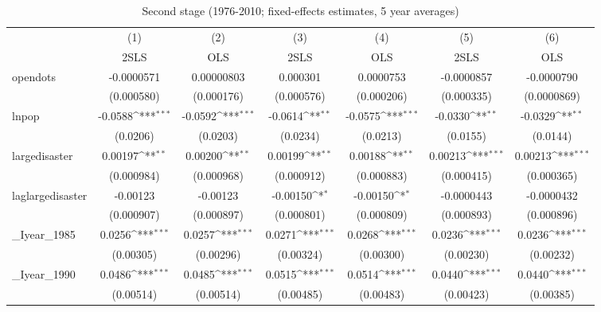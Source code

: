 \begin{table}[htbp]\centering
\def\sym#1{\ifmmode^{#1}\else\(^{#1}\)\fi}
\caption{Second stage (1976-2010; fixed-effects estimates, 5 year averages)}
\begin{tabular}{l*{6}{c}}
\hline\hline
          &\multicolumn{1}{c}{(1)}&\multicolumn{1}{c}{(2)}&\multicolumn{1}{c}{(3)}&\multicolumn{1}{c}{(4)}&\multicolumn{1}{c}{(5)}&\multicolumn{1}{c}{(6)}\\
          &\multicolumn{1}{c}{2SLS}&\multicolumn{1}{c}{OLS}&\multicolumn{1}{c}{2SLS}&\multicolumn{1}{c}{OLS}&\multicolumn{1}{c}{2SLS}&\multicolumn{1}{c}{OLS}\\
\hline
opendots  &-0.0000571         &0.00000803         & 0.000301         &0.0000753         &-0.0000857         &-0.0000790         \\
          &(0.000580)         &(0.000176)         &(0.000576)         &(0.000206)         &(0.000335)         &(0.0000869)         \\
[1em]
lnpop     &  -0.0588\sym{***}&  -0.0592\sym{***}&  -0.0614\sym{**} &  -0.0575\sym{***}&  -0.0330\sym{**} &  -0.0329\sym{**} \\
          & (0.0206)         & (0.0203)         & (0.0234)         & (0.0213)         & (0.0155)         & (0.0144)         \\
[1em]
largedisaster&  0.00197\sym{**} &  0.00200\sym{**} &  0.00199\sym{**} &  0.00188\sym{**} &  0.00213\sym{***}&  0.00213\sym{***}\\
          &(0.000984)         &(0.000968)         &(0.000912)         &(0.000883)         &(0.000415)         &(0.000365)         \\
[1em]
laglargedisaster& -0.00123         & -0.00123         & -0.00150\sym{*}  & -0.00150\sym{*}  &-0.0000443         &-0.0000432         \\
          &(0.000907)         &(0.000897)         &(0.000801)         &(0.000809)         &(0.000893)         &(0.000896)         \\
[1em]
\_Iyear\_1985&   0.0256\sym{***}&   0.0257\sym{***}&   0.0271\sym{***}&   0.0268\sym{***}&   0.0236\sym{***}&   0.0236\sym{***}\\
          &(0.00305)         &(0.00296)         &(0.00324)         &(0.00300)         &(0.00230)         &(0.00232)         \\
[1em]
\_Iyear\_1990&   0.0486\sym{***}&   0.0485\sym{***}&   0.0515\sym{***}&   0.0514\sym{***}&   0.0440\sym{***}&   0.0440\sym{***}\\
          &(0.00514)         &(0.00514)         &(0.00485)         &(0.00483)         &(0.00423)         &(0.00385)         \\

\end{tabular}
\end{table}

